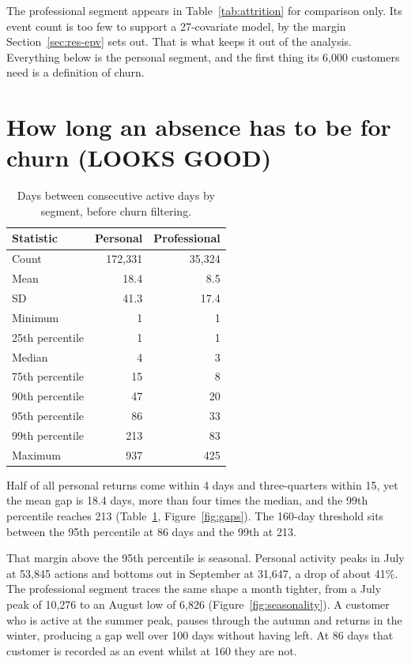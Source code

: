 The professional segment appears in Table~\ref{tab:attrition} for comparison only. Its event count is too few to support a 27-covariate model, by the margin Section~\ref{sec:res-epv} sets out. That is what keeps it out of the analysis. Everything below is the personal segment, and the first thing its 6{,}000 customers need is a definition of churn.
 
\section{How long an absence has to be for churn (LOOKS GOOD)}
\label{sec:res-gaps}
\label{sec:res-seasonality}
 
\begin{table}[htbp]
\centering
\small
\begin{tabular}{@{}lrr@{}}
\toprule
Statistic & Personal & Professional \\
\midrule
Count & 172{,}331 & 35{,}324 \\
Mean  & 18.4 & 8.5 \\
SD    & 41.3 & 17.4 \\
Minimum & 1 & 1 \\
25th percentile & 1 & 1 \\
Median & 4 & 3 \\
75th percentile & 15 & 8 \\
90th percentile & 47 & 20 \\
95th percentile & 86 & 33 \\
99th percentile & 213 & 83 \\
Maximum & 937 & 425 \\
\bottomrule
\end{tabular}
\caption{Days between consecutive active days by segment, before churn filtering.}
\label{tab:gaps-raw}
\end{table}
 
Half of all personal returns come within 4 days and three-quarters within 15, yet the mean gap is 18.4 days, more than four times the median, and the 99th percentile reaches 213 (Table~\ref{tab:gaps-raw}, Figure~\ref{fig:gaps}). The 160-day threshold sits between the 95th percentile at 86 days and the 99th at 213.
 
That margin above the 95th percentile is seasonal. Personal activity peaks in July at 53{,}845 actions and bottoms out in September at 31{,}647, a drop of about 41\%. The professional segment traces the same shape a month tighter, from a July peak of 10{,}276 to an August low of 6{,}826 (Figure~\ref{fig:seasonality}). A customer who is active at the summer peak, pauses through the autumn and returns in the winter, producing a gap well over 100 days without having left. At 86 days that customer is recorded as an event whilst at 160 they are not.
 
